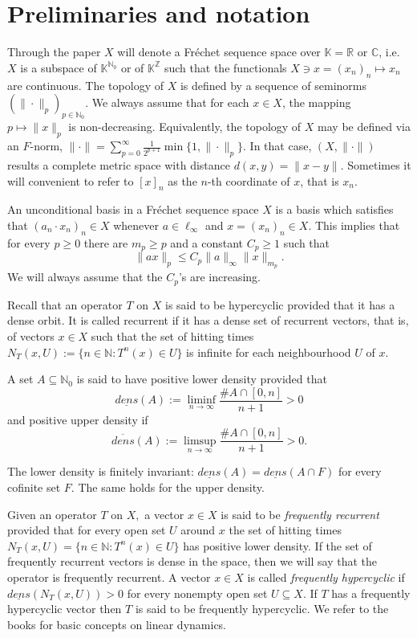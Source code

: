 \documentclass[11pt]{amsart}
\newcommand{\sub}{\subseteq}
\begin{document}
\section{Preliminaries and notation}\label{preliminaries}
Through the paper $X$ will denote a Fr\'echet sequence space over $\mathbb K=\mathbb R$ or $\mathbb C$, i.e. $X$ is a subspace of $\mathbb K^{\mathbb N_0}$ or of $\mathbb K^{\mathbb Z}$ such that the functionals $X\ni x=(x_n)_n\mapsto x_n$ are continuous. The topology of $X$ is defined by a sequence of seminorms $(\|\cdot\|_p)_{p\in \mathbb N_0}$. We always assume that for each $x\in X$, the mapping $p\mapsto \|x\|_p$ is non-decreasing. Equivalently, the topology of $X$ may be defined via an $F$-norm, $\|\cdot\|=\sum_{p=0}^\infty \frac{1}{2^{p+1}} \min\{1,\|\cdot\|_p\}$. In that case, $(X,\|\cdot\|)$ results a complete metric space with distance $d(x,y)=\|x-y\|.$ 
Sometimes it will convenient to refer to $[x]_n$ as the $n$-th coordinate of $x$, that is $x_n$. 

An unconditional basis in a Fr\'echet sequence space $X$ is a basis which satisfies that $(a_n\cdot x_n)_n\in X$ whenever $a\in \ell_\infty $ and $x=(x_n)_n\in X$. This implies that for every $p\ge 0$ there are $m_p\geq p$ and a constant $C_p\ge1$ such that 
\begin{equation}\label{incondicionalidad}
    \|ax\|_p\le C_p\|a\|_{\infty} \|x\|_{m_p}.
\end{equation} 
We will always assume that the $C_p$'s are increasing.

Recall that an operator $T$ on $X$ is said to be hypercyclic provided that it has a dense orbit. It is called recurrent if it has a dense set of recurrent vectors, that is, of vectors $x\in X$ such that the set of hitting times $N_T(x,U):=\{n\in\mathbb N: T^n(x)\in U\}$ is infinite for each neighbourhood $U$ of $x.$ 

A set $A\sub \mathbb N_0$ is said to have positive lower density provided that
$$\underline {dens}(A):=\liminf_{n\to \infty} \frac{\# A\cap [0,n]}{n+1}>0$$
and positive upper density if 
$$\overline {dens}(A):=\limsup_{n\to \infty} \frac{\# A\cap [0,n]}{n+1}>0.$$

The lower density is finitely invariant:  $\underline {dens}(A)=\underline {dens}(A\cap F)$ for every cofinite set $F$. The same holds for the upper density.

Given an operator $T$ on $X,$
a vector $x\in X$ is said to be \emph{frequently recurrent} provided that for every open set $U$ around $x$ the set of hitting times $N_T(x,U) = \{n \in \mathbb{N} : T^n(x) \in U\}$ has positive lower density. If the set of frequently recurrent vectors is dense in the space, then we will say that the operator is frequently recurrent. A vector $x\in X$ is called \emph{frequently hypercyclic } if 
$\underline {dens}(N_T(x,U))>0$ for every nonempty open set $U\sub X$. If $T$ has a frequently hypercyclic vector then $T$ is said to be frequently hypercyclic. We refer to the books \cite{BayMat09,GroPer11} for basic concepts on linear dynamics.
\end{document}
